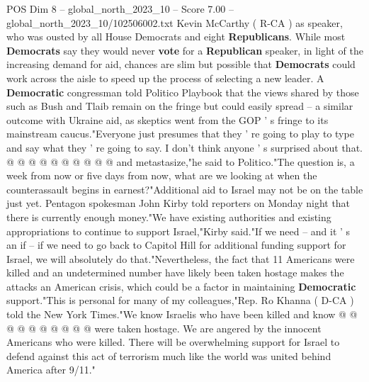\begin{textsample}{POS Dim 8 – global\_north\_2023\_10 – Score 7.00 – global\_north\_2023\_10/102506002.txt}
Kevin McCarthy ( R-CA ) as speaker, who was ousted by all House Democrats and eight \textbf{Republicans}.
While most \textbf{Democrats} say they would never \textbf{vote} for a \textbf{Republican} speaker, in light of the increasing demand for aid, chances are slim but possible that \textbf{Democrats} could work across the aisle to speed up the process of selecting a new leader.
A \textbf{Democratic} congressman told Politico Playbook that the views shared by those such as Bush and Tlaib remain on the fringe but could easily spread -- a similar outcome with Ukraine aid, as skeptics went from the GOP ' s fringe to its mainstream caucus."Everyone just presumes that they ' re going to play to type and say what they ' re going to say.
I don't think anyone ' s surprised about that. @ @ @ @ @ @ @ @ @ @ and metastasize,"he said to Politico."The question is, a week from now or five days from now, what are we looking at when the counterassault begins in earnest?"Additional aid to Israel may not be on the table just yet.
Pentagon spokesman John Kirby told reporters on Monday night that there is currently enough money."We have existing authorities and existing appropriations to continue to support Israel,"Kirby said."If we need -- and it ' s an if -- if we need to go back to Capitol Hill for additional funding support for Israel, we will absolutely do that."Nevertheless, the fact that 11 Americans were killed and an undetermined number have likely been taken hostage makes the attacks an American crisis, which could be a factor in maintaining \textbf{Democratic} support."This is personal for many of my colleagues,"Rep.
Ro Khanna ( D-CA ) told the New York Times."We know Israelis who have been killed and know @ @ @ @ @ @ @ @ @ @ were taken hostage.
We are angered by the innocent Americans who were killed.
There will be overwhelming support for Israel to defend against this act of terrorism much like the world was united behind America after 9/11."

\end{textsample}
